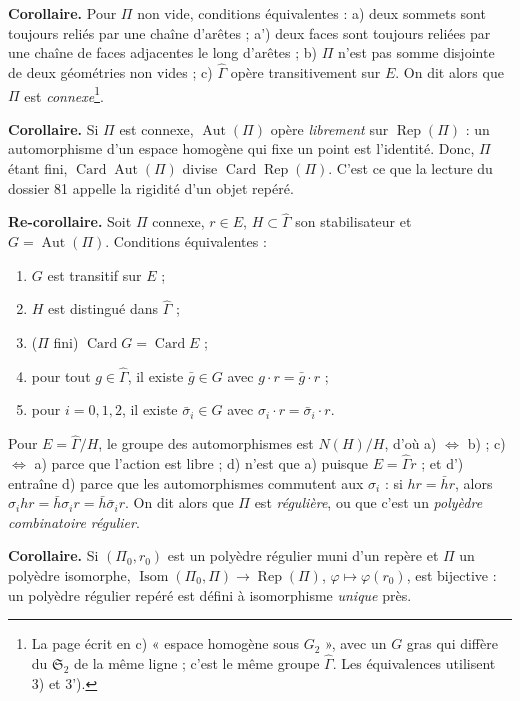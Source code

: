 \documentclass[11pt,a4paper]{article}
\begin{document}
\textbf{Corollaire.} Pour $\Pi$ non vide, conditions équivalentes : a) deux
sommets sont toujours reliés par une chaîne d'arêtes ; a') deux faces sont
toujours reliées par une chaîne de faces adjacentes le long d'arêtes ; b) $\Pi$
n'est pas somme disjointe de deux géométries non vides ; c) $\widehat{\Gamma}$
opère transitivement sur $E$. On dit alors que $\Pi$ est
\emph{connexe}\footnote{La page écrit en c) « espace homogène sous $G_2$ »,
avec un $G$ gras qui diffère du $\mathfrak{S}_2$ de la même ligne ; c'est le
même groupe $\widehat{\Gamma}$. Les équivalences utilisent 3) et 3').}.

\textbf{Corollaire.} Si $\Pi$ est connexe, $\operatorname{Aut}(\Pi)$ opère
\emph{librement} sur $\operatorname{Rep}(\Pi)$ : un automorphisme d'un espace
homogène qui fixe un point est l'identité. Donc, $\Pi$ étant fini,
$\operatorname{Card}\operatorname{Aut}(\Pi)$ divise
$\operatorname{Card}\operatorname{Rep}(\Pi)$. C'est ce que la lecture du
dossier 81 appelle la rigidité d'un objet repéré.

\textbf{Re-corollaire.} Soit $\Pi$ connexe, $r \in E$, $H \subset
\widehat{\Gamma}$ son stabilisateur et $G = \operatorname{Aut}(\Pi)$.
Conditions équivalentes :
\begin{enumerate}
  \item[a)] $G$ est transitif sur $E$ ;
  \item[b)] $H$ est distingué dans $\widehat{\Gamma}$ ;
  \item[c)] ($\Pi$ fini) $\operatorname{Card} G = \operatorname{Card} E$ ;
  \item[d)] pour tout $g \in \widehat{\Gamma}$, il existe $\bar g \in G$ avec
    $g \cdot r = \bar g \cdot r$ ;
  \item[d')] pour $i = 0, 1, 2$, il existe $\bar\sigma_i \in G$ avec
    $\sigma_i \cdot r = \bar\sigma_i \cdot r$.
\end{enumerate}
Pour $E = \widehat{\Gamma}/H$, le groupe des automorphismes est $N(H)/H$, d'où
a) $\Leftrightarrow$ b) ; c) $\Leftrightarrow$ a) parce que l'action est
libre ; d) n'est que a) puisque $E = \widehat{\Gamma} r$ ; et d') entraîne d)
parce que les automorphismes commutent aux $\sigma_i$ : si $h r = \bar h r$,
alors $\sigma_i h r = \bar h \sigma_i r = \bar h \bar\sigma_i r$. On dit alors
que $\Pi$ est \emph{régulière}, ou que c'est un \emph{polyèdre combinatoire
régulier}.

\textbf{Corollaire.} Si $(\Pi_0, r_0)$ est un polyèdre régulier muni d'un
repère et $\Pi$ un polyèdre isomorphe, $\operatorname{Isom}(\Pi_0, \Pi) \to
\operatorname{Rep}(\Pi)$, $\varphi \mapsto \varphi(r_0)$, est bijective : un
polyèdre régulier repéré est défini à isomorphisme \emph{unique} près.
\end{document}
